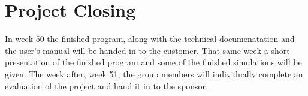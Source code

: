 \section{Project Closing}
In week 50 the finished program, along with the technical documenatation and the
user's manual will be handed in to the customer. That same week a short
presentation of the finished program and some of the finished simulations will
be given. The week after, week 51, the group members will individually complete 
an evaluation of the project and hand it in to the sponsor.
